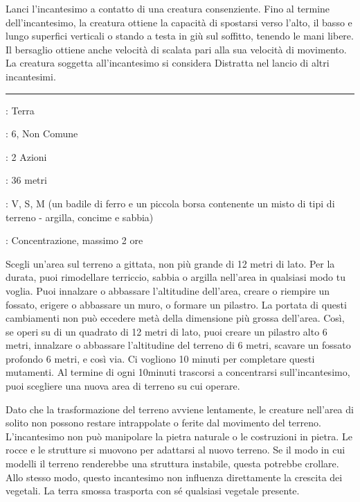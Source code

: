 \begin{multicols}{2}
Lanci l'incantesimo a contatto di una creatura consenziente. Fino al termine dell'incantesimo, la creatura ottiene la capacità di spostarsi verso l'alto, il basso e lungo superfici verticali o stando a testa in giù sul soffitto, tenendo le mani libere. Il bersaglio ottiene anche velocità di scalata pari alla sua velocità di movimento. La creatura soggetta all'incantesimo si considera Distratta nel lancio di altri incantesimi.

\smallskip\noindent\rule{\linewidth}{2pt} \hypertarget{Muovere il Terreno}{}\smallskip{}
\noindent
\begin{description}[noitemsep, topsep=0pt, parsep=0pt, partopsep=0pt, leftmargin=0cm, labelwidth=2.8cm]
	\item[\textbf{Lista di Magia}]: Terra
	\item[\textbf{Livello}]: 6, Non Comune
	\item[\textbf{T. di Lancio}]: 2 Azioni
	\item[\textbf{Gittata}]: 36 metri
	\item[\textbf{Componenti}]: V, S, M (un badile di ferro e un piccola borsa contenente un misto di tipi di terreno - argilla, concime e sabbia)
	\item[\textbf{Durata}]: Concentrazione, massimo 2 ore
\end{description}

Scegli un'area sul terreno a gittata, non più grande di 12 metri di lato. Per la durata, puoi rimodellare terriccio, sabbia o argilla nell'area in qualsiasi modo tu voglia. Puoi innalzare o abbassare l'altitudine dell'area, creare o riempire un fossato, erigere o abbassare un muro, o formare un pilastro. La portata di questi cambiamenti non può eccedere metà della dimensione più grossa dell'area. Così, se operi su di un quadrato di 12 metri di lato, puoi creare un pilastro alto 6 metri, innalzare o abbassare l'altitudine del terreno di 6 metri, scavare un fossato profondo 6 metri, e così via. Ci vogliono 10 minuti per completare questi mutamenti. Al termine di ogni 10minuti trascorsi a concentrarsi sull'incantesimo, puoi scegliere una nuova area di terreno su cui operare.

Dato che la trasformazione del terreno avviene lentamente, le creature nell'area di solito non possono restare intrappolate o ferite dal movimento del terreno. L'incantesimo non può manipolare la pietra naturale o le costruzioni in pietra. Le rocce e le strutture si muovono per adattarsi al nuovo terreno. Se il modo in cui modelli il terreno renderebbe una struttura instabile, questa potrebbe crollare. Allo stesso modo, questo incantesimo non influenza direttamente la crescita dei vegetali. La terra smossa trasporta con sé qualsiasi vegetale presente.


\end{multicols}
